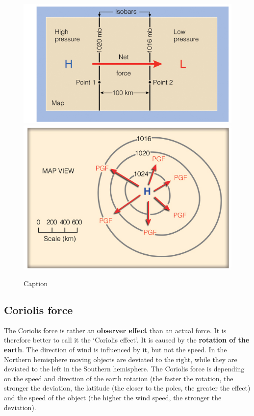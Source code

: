 \documentclass[12pt,oneside]{book}
\begin{document}
\begin{figure}

{\centering \includegraphics[width=0.8\linewidth]{figures/Figure45a} \includegraphics[width=0.8\linewidth]{figures/Figure45b} 

}

\caption{Caption}\label{fig:Pgradforce}
\end{figure}

\subsection{Coriolis force}\label{coriolis-force}

The Coriolis force is rather an \textbf{observer effect} than an actual
force. It is therefore better to call it the `Coriolis effect'. It is
caused by the \textbf{rotation of the earth}. The direction of wind is
influenced by it, but not the speed. In the Northern hemisphere moving
objects are deviated to the right, while they are deviated to the left
in the Southern hemisphere. The Coriolis force is depending on the speed
and direction of the earth rotation (the faster the rotation, the
stronger the deviation, the latitude (the closer to the poles, the
greater the effect) and the speed of the object (the higher the wind
speed, the stronger the deviation).
\end{document}
